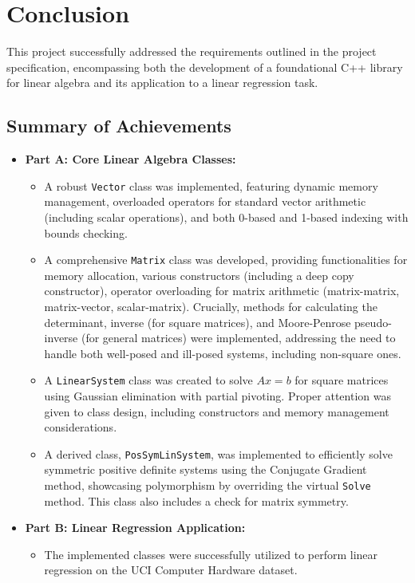 \chapter{Conclusion}
\label{chap:conclusion}

This project successfully addressed the requirements outlined in the project specification, encompassing both the development of a foundational C++ library for linear algebra and its application to a linear regression task.

\section{Summary of Achievements}
\begin{itemize}
    \item \textbf{Part A: Core Linear Algebra Classes:}
    \begin{itemize}
        \item A robust \texttt{Vector} class was implemented, featuring dynamic memory management, overloaded operators for standard vector arithmetic (including scalar operations), and both 0-based and 1-based indexing with bounds checking.
        \item A comprehensive \texttt{Matrix} class was developed, providing functionalities for memory allocation, various constructors (including a deep copy constructor), operator overloading for matrix arithmetic (matrix-matrix, matrix-vector, scalar-matrix). Crucially, methods for calculating the determinant, inverse (for square matrices), and Moore-Penrose pseudo-inverse (for general matrices) were implemented, addressing the need to handle both well-posed and ill-posed systems, including non-square ones.
        \item A \texttt{LinearSystem} class was created to solve $Ax=b$ for square matrices using Gaussian elimination with partial pivoting. Proper attention was given to class design, including constructors and memory management considerations.
        \item A derived class, \texttt{PosSymLinSystem}, was implemented to efficiently solve symmetric positive definite systems using the Conjugate Gradient method, showcasing polymorphism by overriding the virtual \texttt{Solve} method. This class also includes a check for matrix symmetry.
    \end{itemize}
    \item \textbf{Part B: Linear Regression Application:}
    \begin{itemize}
        \item The implemented classes were successfully utilized to perform linear regression on the UCI Computer Hardware dataset.

\end{itemize}
\end{itemize}
